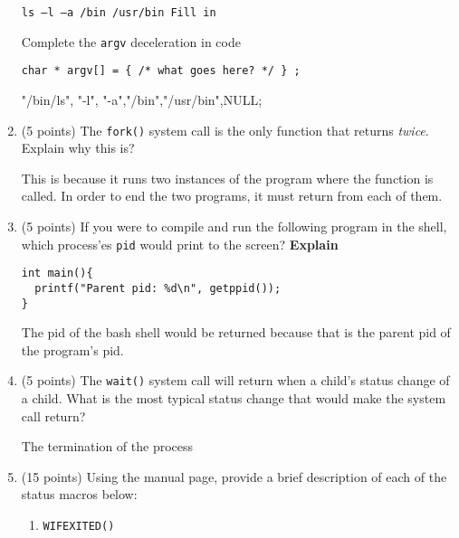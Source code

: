 \documentclass{article}[9pt]
\newenvironment{answerfont}{\fontfamily{qhv}\selectfont}{\par}
\newenvironment{myanswer}{\begin{mdframed}\begin{answerfont}}{\end{answerfont}\end{mdframed}}
\begin{document}
\begin{enumerate}
\begin{verbatim}
ls –l –a /bin /usr/bin Fill in
\end{verbatim}

Complete the \texttt{argv} deceleration in code

\begin{verbatim}
char * argv[] = { /* what goes here? */ } ;
\end{verbatim}

  \begin{myanswer}
    "/bin/ls", "-l", "-a","/bin","/usr/bin",NULL;
  \end{myanswer}

\item (5 points) The \texttt{fork()} system call is the only function that returns
\emph{twice}. Explain why this is?

  \begin{myanswer}
    This is because it runs two instances of the program where the function is called. In order to end the two programs, it must return from each of them.
  \end{myanswer}

\item (5 points) If you were to compile and run the following program in the
shell, which process'es \texttt{pid} would print to the screen?
\textbf{Explain}

\begin{verbatim}
int main(){
  printf("Parent pid: %d\n", getppid());
}
\end{verbatim}

  \begin{myanswer}
    The pid of the bash shell would be returned because that is the parent pid of the program's pid.
  \end{myanswer}


\item (5 points) The \texttt{wait()} system call will return when a child's status change
of a child. What is the most typical status change that would
make the system call return?

  \begin{myanswer}
    The termination of the process
  \end{myanswer}

\item (15 points) Using the manual page, provide a brief description of each of
the status macros below:


\begin{enumerate}
\item \texttt{WIFEXITED()}


\end{enumerate}
\end{enumerate}
\end{document}
